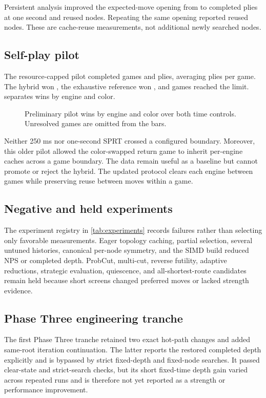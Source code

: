 Persistent analysis improved the expected-move opening from \ColdExpectedMoveDepth{} to \WarmExpectedMoveDepth{} completed plies at one second and reused \ExpectedMoveReusedNodes{} nodes. Repeating the same opening reported \SamePositionReusedNodes{} reused nodes. These are cache-reuse measurements, not additional newly searched nodes.

\subsection{Self-play pilot}
The resource-capped pilot completed \PilotGames games and \PilotPlies plies, averaging \PilotAveragePlies{} plies per game. The hybrid won \PilotHybridWins, the exhaustive reference won \PilotExhaustiveWins, and \PilotUnresolved games reached the limit.  separates wins by engine and color.

\begin{figure}[t]
\centering

\caption{Preliminary pilot wins by engine and color over both time controls. Unresolved games are omitted from the bars.}
\label{fig:pilot-outcomes}
\end{figure}

Neither 250 ms nor one-second SPRT crossed a configured boundary. Moreover, this older pilot allowed the color-swapped return game to inherit per-engine caches across a game boundary. The data remain useful as a baseline but cannot promote or reject the hybrid. The updated protocol clears each engine between games while preserving reuse between moves within a game.

\subsection{Negative and held experiments}
The experiment registry in \cref{tab:experiments} records failures rather than selecting only favorable measurements. Eager topology caching, partial selection, several untuned histories, canonical per-node symmetry, and the SIMD build reduced NPS or completed depth. ProbCut, multi-cut, reverse futility, adaptive reductions, strategic evaluation, quiescence, and all-shortest-route candidates remain held because short screens changed preferred moves or lacked strength evidence.

\subsection{Phase Three engineering tranche}
The first Phase Three tranche retained two exact hot-path changes and added same-root iteration continuation. The latter reports the restored completed depth explicitly and is bypassed by strict fixed-depth and fixed-node searches. It passed clear-state and strict-search checks, but its short fixed-time depth gain varied across repeated runs and is therefore not yet reported as a strength or performance improvement.


